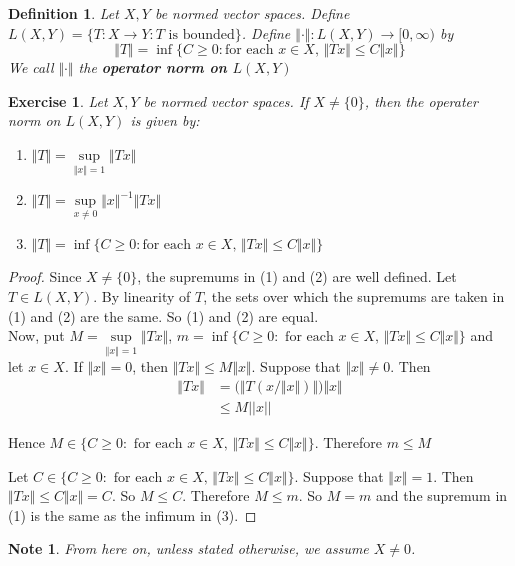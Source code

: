 \documentclass[12pt]{amsart}
\newtheorem{defn}[thm]{Definition}
\newtheorem{note}[thm]{Note}
\newtheorem{ex}[thm]{Exercise}
\newcommand{\Rg}{[0,\infty)}
\newcommand{\n}{\Vert}
\begin{document}
\begin{defn}
Let $X,Y$ be normed vector spaces. Define $L(X,Y) = \{T:X \rightarrow Y: T \text{ is bounded}\}$. Define $\n \cdot\n : L(X,Y)\rightarrow \Rg$ by $$\n T\n  = \inf \{C \geq 0: \text{for each }x \in X\text{, } \n Tx \n \leq C\n x\n \}$$ We call $\n \cdot \n $ the \textbf{operator norm on $L(X,Y)$}
\end{defn}

\begin{ex}
Let $X,Y$ be normed vector spaces. If $X\neq \{0\}$, then the operater norm on $L(X,Y)$ is given by: 
\begin{enumerate}
\item $\n T\n  = \sup\limits_{\n x\n =1}\n Tx\n$
\item $\n T\n  = \sup\limits_{x \neq 0}\n x\n^{-1} \n Tx\n $
\item $\n T\n  = \inf \{C \geq 0: \text{for each }x \in X\text{, } \n Tx \n \leq C\n x\n \}$
\end{enumerate}
\end{ex}

\begin{proof} Since $X \neq \{0\}$, the supremums in (1) and (2) are well defined. Let $T \in L(X,Y)$. By linearity of $T$, the sets over which the supremums are taken in (1) and (2) are the same. So (1) and (2) are equal.\vspace{1cm}\\

Now, put $M = \sup\limits_{\n x \n =1} \n Tx \n $, $m = \inf \{C \geq 0: \text{ for each }x \in X\text{, } \n Tx \n \leq C \n x \n \}$ and let $x \in X$. If $\n x \n =0$, then $\n Tx \n \leq M \n x \n$. Suppose that $\n x \n \neq 0$. Then 
\begin{align*}
\n Tx \n
&= \bigg(\big\n T(x/\n x\n )\big\n \bigg)\n x \n \\
& \leq M ||x||
\end{align*}

Hence $M \in \{C \geq 0: \text{ for each }x \in X\text{, } \n Tx \n \leq C \n x \n\}$. Therefore $m \leq M$

Let $C \in \{C \geq 0: \text{ for each }x \in X\text{, } \n Tx \n \leq C \n x\n \}$. Suppose that $\n x \n =1$. Then $\Vert Tx\Vert \leq C \n x \n = C$. So $M \leq C$. Therefore $M \leq m$. So $M=m$ and the supremum in (1) is the same as the infimum in (3). 
\end{proof}

\begin{note}
From here on, unless stated otherwise, we assume $X \neq 0$.
\end{note}
\end{document}
